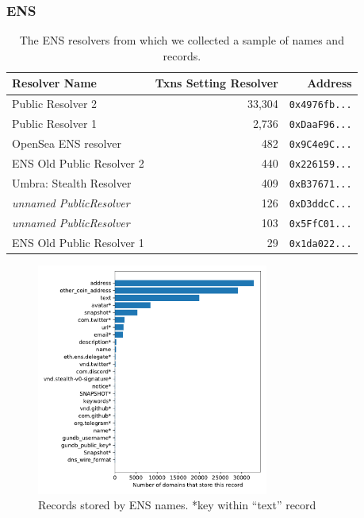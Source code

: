\subsubsection{ENS}

\begin{table}
	\begin{tabular}{lrr}
		\toprule
		Resolver Name & Txns Setting Resolver & Address \\
		\midrule 
		Public Resolver 2 & 33,304 & \texttt{0x4976fb...} \\
		Public Resolver 1 & 2,736 & \texttt{0xDaaF96...} \\
		OpenSea ENS resolver & 482 & \texttt{0x9C4e9C...} \\
		ENS Old Public Resolver 2 & 440	& \texttt{0x226159...} \\
		Umbra: Stealth Resolver & 409 & \texttt{0xB37671...} \\
		\textit{unnamed PublicResolver} & 126 & \texttt{0xD3ddcC...} \\
		\textit{unnamed PublicResolver} & 103 & \texttt{0x5FfC01...} \\
		ENS Old Public Resolver 1 & 29 & \texttt{0x1da022...} \\
		\bottomrule
	\end{tabular}
	\caption{The ENS resolvers from which we collected a 
	sample of names and records.}
	\label{tab:ens_resolvers}
\end{table}

\begin{figure}[t]
	\centering
	\includegraphics[width=3in]{figs/ens_names.pdf}
	\caption{Records stored by ENS names. *key within ``text'' record}
	\label{fig:ens_records}
\end{figure}


